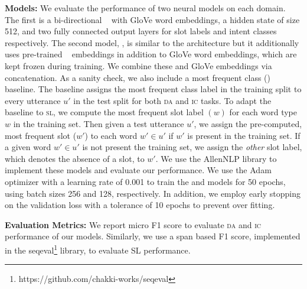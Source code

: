 \textbf{Models:}
We evaluate the performance of two neural models on each domain. The first is a bi-directional \lstm{}~\citep{hochreiter1997long} with GloVe word embeddings, a hidden state of size 512, and two fully connected output layers for slot labels and intent classes respectively. The second model, \elmo{}, is similar to the \lstm{}  architecture but it additionally uses pre-trained \elmo{}~\citep{Peters:2018} embeddings in addition to GloVe word embeddings, which are kept frozen during training.  We combine these \elmo{} and GloVe embeddings via concatenation.
As a sanity check, we also include a most frequent class () baseline. The  baseline assigns the most frequent class label in the training split to every utterance $u'$ in the test split for both \textsc{da} and \textsc{ic} tasks. To adapt the  baseline to \textsc{sl}, we compute the most frequent slot label $(w)$ for each word type $w$ in the training set. Then given a test utterance $u'$, we assign the pre-computed, most frequent slot ($w'$) to each word $w' \in u'$ if $w'$ is present in the training set. If a given word $w' \in u'$ is not present the training set, we assign the \textit{other} slot label, which denotes the absence of a slot, to $w'$. 
We use the AllenNLP \citep{Gardner2017AllenNLP} library to implement these models and evaluate our performance. 
We use the Adam optimizer \citep{kingma2014adam} with a learning rate of 0.001 to train the \lstm{} and \elmo{} models for 50 epochs, using batch sizes 256 and 128, respectively.  In addition, we employ early stopping on the validation loss with a tolerance of 10 epochs to prevent over fitting.

\textbf{Evaluation Metrics:}
We report micro F1 score to evaluate \textsc{da} and \textsc{ic} performance of our models. Similarly, we use a span based F1 score, implemented in the seqeval\footnote{https://github.com/chakki-works/seqeval} library,  to evaluate SL performance.


